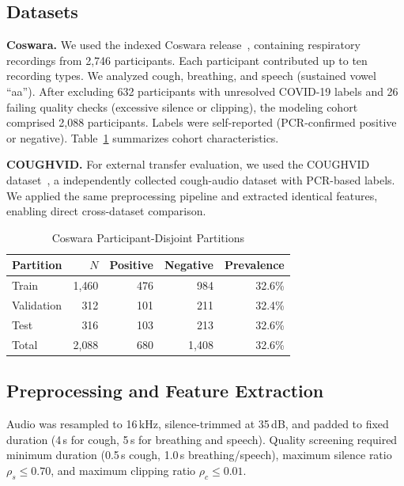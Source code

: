 \documentclass[conference]{IEEEtran}
\begin{document}
\subsection{Datasets}

\textbf{Coswara.} We used the indexed Coswara release~\cite{bhattacharya2023}, containing respiratory recordings from 2{,}746 participants. Each participant contributed up to ten recording types. We analyzed cough, breathing, and speech (sustained vowel ``aa''). After excluding 632 participants with unresolved COVID-19 labels and 26 failing quality checks (excessive silence or clipping), the modeling cohort comprised 2{,}088 participants. Labels were self-reported (PCR-confirmed positive or negative). Table~\ref{tab:cohort} summarizes cohort characteristics.

\textbf{COUGHVID.} For external transfer evaluation, we used the COUGHVID dataset~\cite{orlandic2021}, a independently collected cough-audio dataset with PCR-based labels. We applied the same preprocessing pipeline and extracted identical features, enabling direct cross-dataset comparison.

\begin{table}[!t]
\centering
\caption{Coswara Participant-Disjoint Partitions}
\label{tab:cohort}
\footnotesize
\begin{tabular}{@{}lrrrr@{}}
\toprule
Partition & $N$ & Positive & Negative & Prevalence \\
\midrule
Train      & 1{,}460 & 476 & 984 & 32.6\% \\
Validation &   312 & 101 & 211 & 32.4\% \\
Test       &   316 & 103 & 213 & 32.6\% \\
\midrule
Total      & 2{,}088 & 680 & 1{,}408 & 32.6\% \\
\bottomrule
\end{tabular}
\end{table}

\subsection{Preprocessing and Feature Extraction}

Audio was resampled to 16\,kHz, silence-trimmed at 35\,dB, and padded to fixed duration (4\,s for cough, 5\,s for breathing and speech). Quality screening required minimum duration (0.5\,s cough, 1.0\,s breathing/speech), maximum silence ratio $\rho_s \leq 0.70$, and maximum clipping ratio $\rho_c \leq 0.01$.
\end{document}
